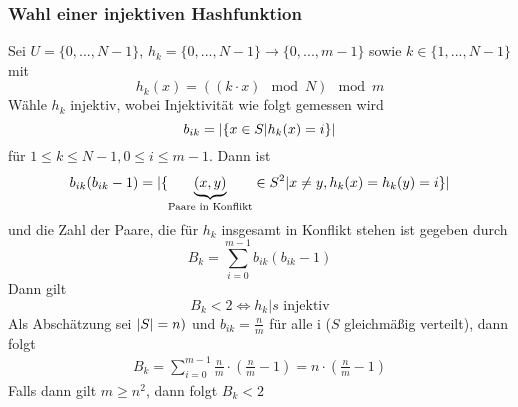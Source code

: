             \subsubsection{Wahl einer injektiven Hashfunktion}
                Sei $U= \{ 0,...,N-1 \}$, $h_k = \{0,...,N-1 \} \rightarrow \{ 0,...,m-1 \}$ sowie $k \in \{1,...,N-1 \}$ mit
                $$
                    h_k(x) = ((k \cdot x) \mod N) \mod m
                $$
                Wähle $h_k$ injektiv, wobei Injektivität wie folgt gemessen wird
                $$
                    b_{ik} = \lvert\{ x \in S | h_k(x) = i \} \rvert 
                $$
                für $1 \leq k \leq N-1, 0 \leq i \leq m-1$. Dann ist 
                $$
                    b_{ik}(b_{ik}-1) = \lvert \{ \underbrace{(x,y)}_{\text{Paare in Konflikt}} \in S^2 | x \neq y, h_k(x) = h_k(y) = i \} \rvert
                $$
                und die Zahl der Paare, die für $h_k$ insgesamt in Konflikt stehen ist gegeben durch
                $$
                    B_k = \sum_{i=0}^{m-1}{b_{ik}(b_{ik}-1)}
                $$
                Dann gilt
                $$
                    B_k < 2 \Leftrightarrow h_k|s \text{ injektiv}
                $$
                Als Abschätzung sei $\lvert S\rvert = n)$ und $b_{ik} = \frac{n}{m}$ für alle i ($S$ gleichmäßig verteilt), dann folgt
                \begin{align*}
                    B_k = \sum_{i=0}^{m-1}{\frac{n}{m} \cdot \left(\frac{n}{m}-1 \right)} = n \cdot \left( \frac{n}{m}-1 \right)
                \end{align*}
                Falls dann gilt $m \geq n^2$, dann folgt $B_k < 2$
                

